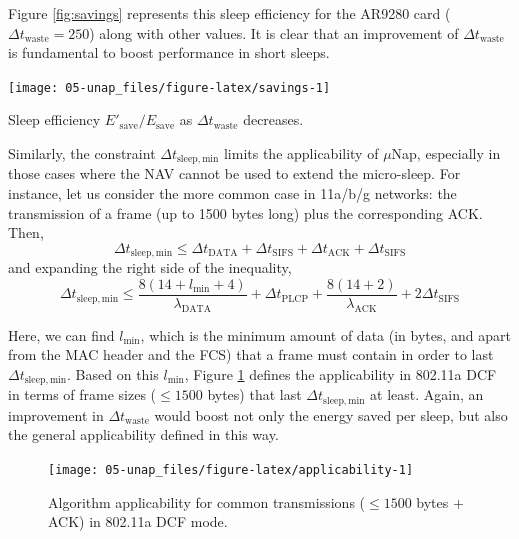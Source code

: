 \documentclass[twoside,nohyper]{tufte-book}
\theoremstyle{definition}
\theoremstyle{definition}
\theoremstyle{definition}
\theoremstyle{remark}
\begin{document}
Figure \ref{fig:savings} represents this sleep efficiency for the AR9280
card (\(\Delta t_\mathrm{waste}=250\)) along with other values. It is
clear that an improvement of \(\Delta t_\mathrm{waste}\) is fundamental
to boost performance in short sleeps.




\begin{marginfigure}[-6in]

{\centering \texttt{[image: 05-unap\_files/figure-latex/savings-1]} 

}

\caption[Sleep efficiency \(E'_\mathrm{save}/E_\mathrm{save}\) as
\(\Delta t_\mathrm{waste}\) decreases.]{Sleep efficiency \(E'_\mathrm{save}/E_\mathrm{save}\) as
\(\Delta t_\mathrm{waste}\) decreases.}\label{fig:savings}
\end{marginfigure}

Similarly, the constraint \(\Delta t_\mathrm{sleep,min}\) limits the
applicability of \(\mu\)Nap, especially in those cases where the NAV
cannot be used to extend the micro-sleep. For instance, let us consider
the more common case in 11a/b/g networks: the transmission of a frame
(up to 1500 bytes long) plus the corresponding ACK. Then,
%
\begin{equation}
 \Delta t_\mathrm{sleep,min} \le \Delta t_\mathrm{DATA} + \Delta t_\mathrm{SIFS} + \Delta t_\mathrm{ACK} + \Delta t_\mathrm{SIFS} \label{eq:tsleepmin}
\end{equation}
%
and expanding the right side of the inequality,
%
\begin{equation*}
 \Delta t_\mathrm{sleep,min} \le \frac{8(14+l_\mathrm{min}+4)}{\lambda_\mathrm{DATA}} + \Delta t_\mathrm{PLCP} + \frac{8(14+2)}{\lambda_\mathrm{ACK}} + 2\Delta t_\mathrm{SIFS}
\end{equation*}
%

Here, we can find \(l_\mathrm{min}\), which is the minimum amount of
data (in bytes, and apart from the MAC header and the FCS) that a frame
must contain in order to last \(\Delta t_\mathrm{sleep,min}\). Based on
this \(l_\mathrm{min}\), Figure \ref{fig:applicability} defines the
applicability in 802.11a DCF in terms of frame sizes (\(\le 1500\)
bytes) that last \(\Delta t_\mathrm{sleep,min}\) at least. Again, an
improvement in \(\Delta t_\mathrm{waste}\) would boost not only the
energy saved per sleep, but also the general applicability defined in
this way.




\begin{figure}

{\centering \texttt{[image: 05-unap\_files/figure-latex/applicability-1]} 

}

\caption[Algorithm applicability for common transmissions
(\(\le 1500\) bytes \(+\) ACK) in 802.11a DCF mode.]{Algorithm applicability for common transmissions
(\(\le 1500\) bytes \(+\) ACK) in 802.11a DCF mode.}\label{fig:applicability}
\end{figure}
\end{document}
